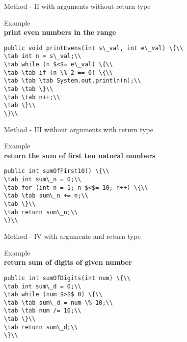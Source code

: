 \documentclass[aspectratio=169,14pt,usenames,dvipsnames]{beamer}
\newcommand\tab[1][1cm]{\hspace*{#1}}
\begin{document}
\begin{frame}{Method - II}
with arguments without return type
\begin{block}{Example}\\
\textbf{print even numbers in the range}\\
\begin{lstlisting}
public void printEvens(int s\_val, int e\_val) \{\\
\tab int n = s\_val;\\
\tab while (n $<$= e\_val) \{\\
\tab \tab if (n \% 2 == 0) \{\\
\tab \tab \tab System.out.println(n);\\
\tab \tab \}\\
\tab \tab n++;\\
\tab \}\\
\}\\
\end{lstlisting}
\end{block}
\end{frame}

\begin{frame}{Method - III}
without arguments with return type
\begin{block}{Example}\\
\textbf{return the sum of first ten natural numbers}\\
\begin{lstlisting}
public int sumOfFirst10() \{\\
\tab int sum\_n = 0;\\
\tab for (int n = 1; n $<$= 10; n++) \{\\
\tab \tab sum\_n += n;\\
\tab \}\\
\tab return sum\_n;\\
\}\\
\end{lstlisting}
\end{block}
\end{frame}

\begin{frame}{Method - IV}
with arguments and return type
\begin{block}{Example}\\
\textbf{return sum of digits of given number}\\
\begin{lstlisting}
public int sumOfDigits(int num) \{\\
\tab int sum\_d = 0;\\
\tab while (num $>$$ 0) \{\\
\tab \tab sum\_d = num \% 10;\\
\tab \tab num /= 10;\\
\tab \}\\
\tab return sum\_d;\\
\}\\
\end{lstlisting}
\end{block}
\end{frame}
\end{document}
